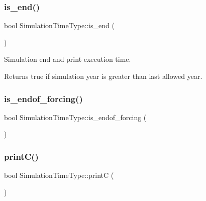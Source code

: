 \subsubsection{\texorpdfstring{is\+\_\+end()}{is\_end()}}
{\footnotesize\ttfamily bool Simulation\+Time\+Type\+::is\+\_\+end (\begin{DoxyParamCaption}{ }\end{DoxyParamCaption})}

Simulation end and print execution time. \begin{DoxyReturn}{Returns}
true if simulation year is greater than last allowed year. 
\end{DoxyReturn}
\mbox{\label{class_simulation_time_type_a3a35775fa077823a5849b288ae70d196}} 
\subsubsection{\texorpdfstring{is\+\_\+endof\+\_\+forcing()}{is\_endof\_forcing()}}
{\footnotesize\ttfamily bool Simulation\+Time\+Type\+::is\+\_\+endof\+\_\+forcing (\begin{DoxyParamCaption}{ }\end{DoxyParamCaption})\hspace{0.3cm}{\ttfamily [inline]}}

\mbox{\label{class_simulation_time_type_a56b971d5c4f04df090fcc7ce9764f5b9}} 
\subsubsection{\texorpdfstring{print\+C()}{printC()}}
{\footnotesize\ttfamily bool Simulation\+Time\+Type\+::printC (\begin{DoxyParamCaption}{ }\end{DoxyParamCaption})\hspace{0.3cm}{\ttfamily [inline]}}

\mbox{\label{class_simulation_time_type_a271e291f8da1ae72337d456ce3899f3c}} 
